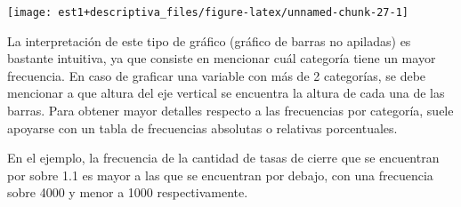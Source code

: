 \documentclass[
  11pt,
]{book}
\newenvironment{Shaded}{\begin{snugshade}}{\end{snugshade}}
\newcommand{\AttributeTok}[1]{\textcolor[rgb]{0.13,0.29,0.53}{#1}}
\newcommand{\CommentTok}[1]{\textcolor[rgb]{0.56,0.35,0.01}{\textit{#1}}}
\newcommand{\FloatTok}[1]{\textcolor[rgb]{0.00,0.00,0.81}{#1}}
\newcommand{\FunctionTok}[1]{\textcolor[rgb]{0.13,0.29,0.53}{\textbf{#1}}}
\newcommand{\NormalTok}[1]{#1}
\newcommand{\OtherTok}[1]{\textcolor[rgb]{0.56,0.35,0.01}{#1}}
\newcommand{\SpecialCharTok}[1]{\textcolor[rgb]{0.81,0.36,0.00}{\textbf{#1}}}
\newcommand{\StringTok}[1]{\textcolor[rgb]{0.31,0.60,0.02}{#1}}
\theoremstyle{definition}
\theoremstyle{definition}
\theoremstyle{definition}
\theoremstyle{definition}
\theoremstyle{remark}
\begin{document}
\begin{Shaded}
\end{Shaded}

\begin{center}\texttt{[image: est1+descriptiva\_files/figure-latex/unnamed-chunk-27-1]} \end{center}

La interpretación de este tipo de gráfico (gráfico de barras no apiladas) es bastante intuitiva, ya que consiste en mencionar cuál categoría tiene un mayor frecuencia. En caso de graficar una variable con más de 2 categorías, se debe mencionar a que altura del eje vertical se encuentra la altura de cada una de las barras. Para obtener mayor detalles respecto a las frecuencias por categoría, suele apoyarse con un tabla de frecuencias absolutas o relativas porcentuales.

En el ejemplo, la frecuencia de la cantidad de tasas de cierre que se encuentran por sobre 1.1 es mayor a las que se encuentran por debajo, con una frecuencia sobre 4000 y menor a 1000 respectivamente.
\end{document}
